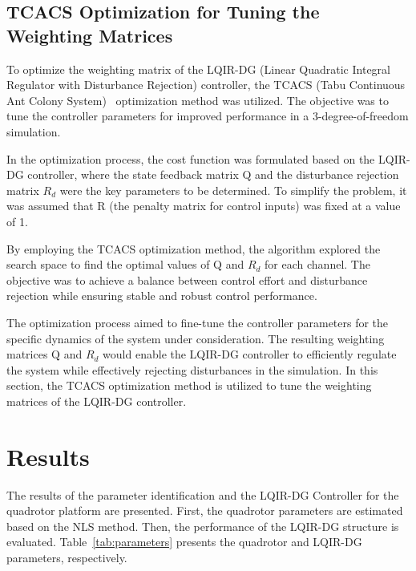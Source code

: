 \documentclass[3p]{elsarticle}
\begin{document}



\subsection{TCACS Optimization for Tuning the Weighting Matrices}
\noindent To optimize the weighting matrix of the LQIR-DG (Linear Quadratic Integral Regulator with Disturbance Rejection) controller, the TCACS (Tabu Continuous Ant Colony System)~\cite{10.1007/978-3-540-28646-2_27} optimization method was utilized. The objective was to tune the controller parameters for improved performance in a 3-degree-of-freedom simulation.

In the optimization process, the cost function was formulated based on the LQIR-DG controller, where the state feedback matrix $\boldsymbol{\mathrm{Q}}$ and the disturbance rejection matrix $R_d$ were the key parameters to be determined. To simplify the problem, it was assumed that R (the penalty matrix for control inputs) was fixed at a value of 1.

By employing the TCACS optimization method, the algorithm explored the search space to find the optimal values of $\boldsymbol{\mathrm{Q}}$ and $R_d$ for each channel. The objective was to achieve a balance between control effort and disturbance rejection while ensuring stable and robust control performance.

The optimization process aimed to fine-tune the controller parameters for the specific dynamics of the system under consideration. The resulting weighting matrices $\boldsymbol{\mathrm{Q}}$ and $R_d$ would enable the LQIR-DG controller to efficiently regulate the system while effectively rejecting disturbances in the simulation.
\noindent In this section, the TCACS optimization method is utilized to tune the weighting matrices of the LQIR-DG controller. 
\section{Results}\label{sec:results}
\noindent The results of the parameter identification and the LQIR-DG Controller for the quadrotor platform are presented. First, the quadrotor parameters are estimated based on the NLS method. Then, the performance of the LQIR-DG structure is evaluated.
Table~\ref{tab:parameters} presents the quadrotor and LQIR-DG parameters, respectively.
\end{document}
